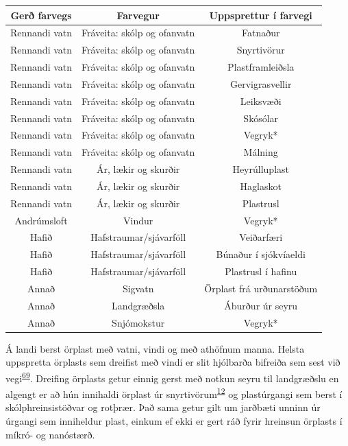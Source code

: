 \documentclass[icelandic,]{book}
\begin{document}
\begin{tabular}{ccc}
\toprule
Gerð farvegs & Farvegur & Uppsprettur í farvegi\\
\midrule
Rennandi vatn & Fráveita: skólp og ofanvatn & Fatnaður\\
Rennandi vatn & Fráveita: skólp og ofanvatn & Snyrtivörur\\
Rennandi vatn & Fráveita: skólp og ofanvatn & Plastframleiðsla\\
Rennandi vatn & Fráveita: skólp og ofanvatn & Gervigrasvellir\\
Rennandi vatn & Fráveita: skólp og ofanvatn & Leiksvæði\\
\addlinespace
Rennandi vatn & Fráveita: skólp og ofanvatn & Skósólar\\
Rennandi vatn & Fráveita: skólp og ofanvatn & Vegryk*\\
Rennandi vatn & Fráveita: skólp og ofanvatn & Málning\\
Rennandi vatn & Ár, lækir og skurðir & Heyrúlluplast\\
Rennandi vatn & Ár, lækir og skurðir & Haglaskot\\
\addlinespace
Rennandi vatn & Ár, lækir og skurðir & Plastrusl\\
Andrúmsloft & Vindur & Vegryk*\\
Hafið & Hafstraumar/sjávarföll & Veiðarfæri\\
Hafið & Hafstraumar/sjávarföll & Búnaður í sjókvíaeldi\\
Hafið & Hafstraumar/sjávarföll & Plastrusl í hafinu\\
\addlinespace
Annað & Sigvatn & Örplast frá urðunarstöðum\\
Annað & Landgræðsla & Áburður úr seyru\\
Annað & Snjómokstur & Vegryk*\\
\bottomrule
\end{tabular}

Á landi berst örplast með vatni, vindi og með athöfnum manna. Helsta uppspretta örplasts sem dreifist með vindi er slit hjólbarða bifreiða sem sest við vegi\textsuperscript{\protect\hyperlink{ref-Cadle1978}{69}}. Dreifing örplasts getur einnig gerst með notkun seyru til landgræðslu en algengt er að hún innihaldi örplast úr snyrtivörum\textsuperscript{\protect\hyperlink{ref-zitko1991another}{12}} og plastúrgangi sem berst í skólphreinsistöðvar og rotþrær. Það sama getur gilt um jarðbæti unninn úr úrgangi sem inniheldur plast, einkum ef ekki er gert ráð fyrir hreinsun örplasts í míkró- og nanóstærð.
\end{document}
